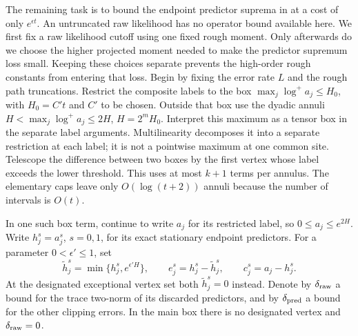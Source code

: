 The remaining task is to bound the endpoint predictor suprema in
 at a cost of only $e^{\epsilon t}$.
An untruncated raw likelihood has no operator bound available here.
We first fix a raw likelihood cutoff using one fixed rough moment.
Only afterwards do we choose the higher projected moment needed to
make the predictor supremum loss small. Keeping these choices separate
prevents the high-order rough constants from entering that loss. Begin by fixing the error rate $L$ and the rough
path truncations. Restrict the composite labels to the box
$\max_j\log^+ a_j\leq H_0$, with $H_0=C't$ and $C'$ to be chosen.
Outside that box use the dyadic annuli
$H<\max_j\log^+a_j\leq2H$, $H=2^mH_0$.
Interpret this maximum as a tensor box in the separate label
arguments. Multilinearity decomposes it into a separate restriction
at each label; it is not a pointwise maximum at one common site.
Telescope the difference between two boxes by the first vertex whose
label exceeds the lower threshold. This uses at most $k+1$ terms
per annulus. The elementary caps leave only $O(\log(t+2))$ annuli
because the number of intervals is $O(t)$.

In one such box term, continue to write $a_j$ for its restricted
label, so $0\leq a_j\leq e^{2H}$. Write $h_j^s=a_j^s$, $s=0,1$,
for its exact stationary endpoint predictors. For a parameter
$0<\epsilon'\leq1$, set
\[
 \widetilde h_j^s=\min\{h_j^s,e^{\epsilon'H}\},\qquad
 e_j^s=h_j^s-\widetilde h_j^s,
 \qquad c_j^s=a_j-h_j^s.
\]
At the designated exceptional vertex set both $\widetilde h_j^s=0$
instead. Denote by $\delta_{\rm raw}$ a bound for the trace two-norm
of its discarded predictors, and by $\delta_{\rm pred}$ a bound for
the other clipping errors. In the main box there is no designated
vertex and $\delta_{\rm raw}=0$.

